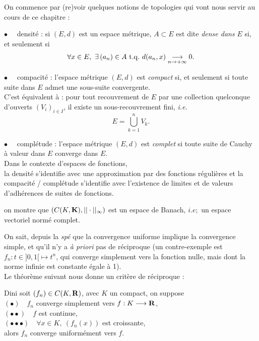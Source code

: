 \documentclass[a4paper,11pt, twoside]{article}
\begin{document}


On commence par (re)voir quelques notions de topologies qui vont nous servir au cours de ce chapitre :



$\bullet\quad$ densité : si $(E,d)$ est un espace métrique, $A\subset E$ est dite \emph{dense dans }$E$ si, et seulement si 
$$\forall x\in E,\ \exists \left(a_n\right)\in A\ \mathrm{t.q.}\ d(a_n,x)\tend 0.$$

$\bullet\quad$ compacité : l'espace métrique $(E,d)$ est \emph{compact} si, et seulement si toute suite dans $E$ admet une sous-suite convergente.\\
C'est équivalent à : pour tout recouvrement de $E$ par une collection quelconque d'ouverts $\left(V_i\right)_{i\in I}$, il existe un sous-recouvrement fini, \emph{i.e.} 
$$E=\bigcup_{k=1}^nV_k.$$

$\bullet\quad$ complétude :  l'espace métrique $(E,d)$ est \emph{complet} si toute suite de Cauchy à valeur dans $E$ converge dans $E$.\\

Dans le contexte d'espaces de fonctions,\\
la densité s'identifie avec une approximation par des fonctions régulières et la compacité / complétude s'identifie avec l'existence de limites et de valeurs d'adhérences de suites de fonctions.\\


\setcounter{CompteurRemarque}{0}
\begin{RQ}
  on montre que $\left(C(K,\mathbf K),||\cdot||_{\infty}\right)$ est un espace de Banach, $i.e;$ un espace vectoriel normé complet.
\end{RQ} 





On sait, depuis la \emph{spé} que la convergence uniforme implique la convergence simple, et qu'il n'y a \emph{à priori} pas de réciproque (un contre-exemple est $f_n :t\in ]0,1[ \longmapsto t^n$, qui converge simplement vers la fonction nulle, mais dont la norme infinie est constante égale à 1).\\
Le théorème suivant nous donne un critère de réciproque :\\


\begin{thC}{Dini}
  soit $\left(f_n\right)\in C(K,\mathbf R)$, avec $K$ un compact, on suppose\\
  $(\bullet)\quad f_n$ converge simplement vers $f:K\longrightarrow\mathbf R$,\\
  $(\bullet\bullet)\quad f$ est continue,\\
  $(\bullet\bullet\bullet)\quad \forall x\in K,\ \left(f_n(x)\right)$ est croissante,\\

  alors $f_n$ converge uniformément vers $f$.
\end{thC}
\end{document}
